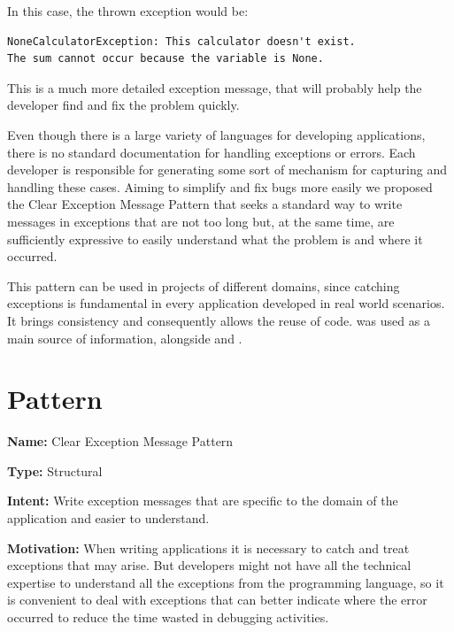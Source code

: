 \documentclass[12pt]{article}
\begin{document}
In this case, the thrown exception would be: 

\begin{verbatim}
NoneCalculatorException: This calculator doesn't exist. 
The sum cannot occur because the variable is None.
\end{verbatim}
This is a much more detailed exception message, that will probably help the developer find and fix the problem quickly.

Even though there is a large variety of languages for developing applications, there is no standard documentation for handling exceptions or errors. Each developer is responsible for generating some sort of mechanism for capturing and handling these cases. Aiming to simplify and fix bugs more easily we proposed the Clear Exception Message Pattern that seeks a standard way to write messages in exceptions that are not too long but, at the same time, are sufficiently expressive to easily understand what the problem is and where it occurred.

This pattern can be used in projects of different domains, since catching exceptions is fundamental in every application developed in real world scenarios. It brings consistency and consequently allows the reuse of code.\cite{1687854} was used as a main source of information, alongside \cite{smith:99} and \cite{bernardo2008importancia}.

\section{Pattern}

\begin{flushleft}
\textbf{Name:} Clear Exception Message Pattern \\
\end{flushleft}

\begin{flushleft}
\textbf{Type:} Structural \\
\end{flushleft}

\begin{flushleft}
\textbf{Intent:} Write exception messages that are specific to the domain of the application and easier to understand.\\
\end{flushleft}

\begin{flushleft}
\textbf{Motivation:}
When writing applications it is necessary to catch and treat exceptions that may arise. But developers might not have all the technical expertise to understand all the exceptions from the programming language, so it is convenient to deal with exceptions that can better indicate where the error occurred to reduce the time wasted in debugging activities.\\
\end{flushleft}
\end{document}
